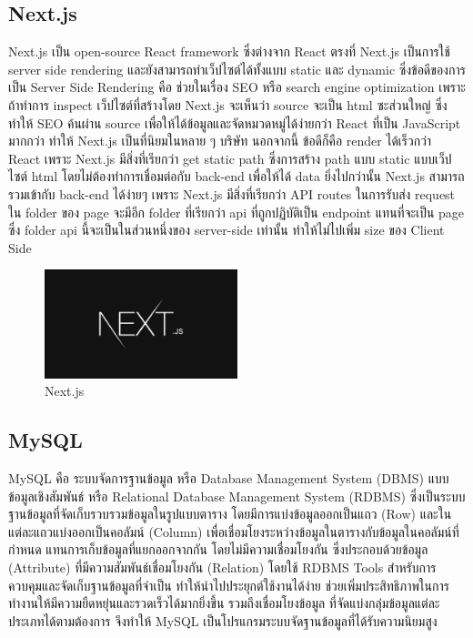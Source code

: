 \subsection{Next.js}
Next.js \cite{web:nextjs} เป็น open-source React framework ซึ่งต่างจาก React ตรงที่ Next.js เป็นการใช้ server side rendering และยังสามารถทำเว็ปไซต์ได้ทั้งแบบ static และ dynamic ซึ่งข้อดีของการเป็น Server Side Rendering คือ ช่วยในเรื่อง SEO หรือ search engine optimization เพราะถ้าทำการ inspect เว็ปไซต์ที่สร้างโดย Next.js จะเห็นว่า source จะเป็น html ซะส่วนใหญ่ ซึ่งทำให้ SEO ค้นผ่าน source เพื่อให้ได้ข้อมูลและจัดหมวดหมู่ได้ง่ายกว่า React ที่เป็น JavaScript มากกว่า ทำให้ Next.js เป็นที่นิยมในหลาย ๆ บริษัท นอกจากนี้ ข้อดีก็คือ render ได้เร็วกว่า React เพราะ Next.js มีสิ่งที่เรียกว่า get static path ซึ่งการสร้าง path แบบ static แบบเว็ปไซต์ html โดยไม่ต้องทำการเชื่อมต่อกับ back-end เพื่อให้ได้ data ยิ่งไปกว่านั้น Next.js สามารถรวมเข้ากับ back-end ได้ง่ายๆ เพราะ Next.js มีสิ่งที่เรียกว่า API routes ในการรับส่ง request ใน folder ของ page จะมีอีก folder ที่เรียกว่า api ที่ถูกปฏิบัติเป็น endpoint แทนที่จะเป็น page ซึ่ง folder api นี้จะเป็นในส่วนหนึ่งของ server-side เท่านั้น ทำให้ไม่ไปเพิ่ม size ของ Client Side
\begin{figure}
    \centering
    \includegraphics[width=0.5\textwidth]{img/nextjs.png}
    \caption{Next.js}
    \label{fig:nextjs}
\end{figure}
\subsection{MySQL}
MySQL \cite{web:mysql} คือ ระบบจัดการฐานข้อมูล หรือ Database Management System (DBMS) แบบข้อมูลเชิงสัมพันธ์ หรือ Relational Database Management System (RDBMS) ซึ่งเป็นระบบฐานข้อมูลที่จัดเก็บรวบรวมข้อมูลในรูปแบบตาราง โดยมีการแบ่งข้อมูลออกเป็นแถว (Row) และในแต่ละแถวแบ่งออกเป็นคอลัมน์ (Column) เพื่อเชื่อมโยงระหว่างข้อมูลในตารางกับข้อมูลในคอลัมน์ที่กำหนด แทนการเก็บข้อมูลที่แยกออกจากกัน โดยไม่มีความเชื่อมโยงกัน ซึ่งประกอบด้วยข้อมูล (Attribute) ที่มีความสัมพันธ์เชื่อมโยงกัน (Relation) โดยใช้ RDBMS Tools สำหรับการควบคุมและจัดเก็บฐานข้อมูลที่จำเป็น ทำให้นำไปประยุกต์ใช้งานได้ง่าย ช่วยเพิ่มประสิทธิภาพในการทำงานให้มีความยืดหยุ่นและรวดเร็วได้มากยิ่งขึ้น รวมถึงเชื่อมโยงข้อมูล ที่จัดแบ่งกลุ่มข้อมูลแต่ละประเภทได้ตามต้องการ จึงทำให้ MySQL เป็นโปรแกรมระบบจัดฐานข้อมูลที่ได้รับความนิยมสูง

